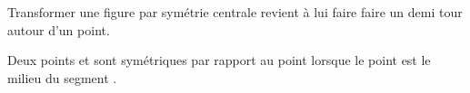 Transformer une figure par symétrie centrale revient à lui faire faire un demi
tour autour d'un point.\par\noindent
Deux points  et  sont symétriques par rapport au
point  lorsque le point  est le milieu du segment
\mathspoint{[BB']}.